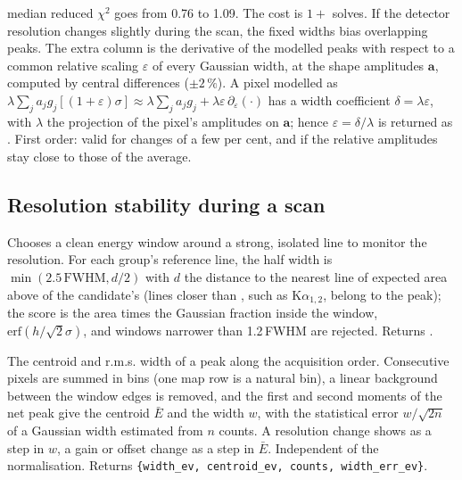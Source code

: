 median reduced $\chi^2$ goes from 0.76 to 1.09. The cost is $1+{}$
solves.
 If the detector resolution changes slightly during the scan, the fixed
widths bias overlapping peaks. The extra column is the derivative of the modelled peaks with
respect to a common relative scaling $\varepsilon$ of every Gaussian width, at the shape
amplitudes $\mathbf a$, computed by central differences ($\pm2\,\%$). A pixel modelled as
$\lambda\sum_j a_j g_j[(1+\varepsilon)\sigma] \approx \lambda\sum_j a_j g_j + \lambda\varepsilon
\,\partial_\varepsilon(\cdot)$ has a width coefficient $\delta = \lambda\varepsilon$, with
$\lambda$ the projection of the pixel's amplitudes on $\mathbf a$; hence $\varepsilon =
\delta/\lambda$ is returned as . First order: valid for changes of a few per
cent, and if the relative amplitudes stay close to those of the average.

\subsection{Resolution stability during a scan}

Chooses a clean energy window around a strong, isolated line to monitor the resolution. For
each group's reference line, the half width is $\min(2.5\,\mathrm{FWHM}, d/2)$ with $d$ the
distance to the nearest line of expected area above  of the candidate's (lines
closer than , such as K$\alpha_{1,2}$, belong to the peak); the score is the
area times the Gaussian fraction inside the window, $\mathrm{erf}(h/\sqrt2\sigma)$, and
windows narrower than 1.2\,FWHM are rejected. Returns .

The centroid and r.m.s. width of a peak along the acquisition order. Consecutive pixels are
summed in bins (one map row is a natural bin), a linear background between the window edges
is removed, and the first and second moments of the net peak give the centroid $\bar E$ and
the width $w$, with the statistical error $w/\sqrt{2n}$ of a Gaussian width estimated from
$n$ counts. A resolution change shows as a step in $w$, a gain or offset change as a step in
$\bar E$. Independent of the normalisation. Returns \texttt{\{width\_ev, centroid\_ev, counts,
width\_err\_ev\}}.

